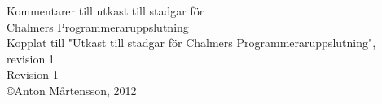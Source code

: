 \documentclass[a4paper]{article}
\begin{document}
\begin{center}
	{\Huge Kommentarer till utkast till stadgar för} \\[0.5em]
	{\Huge Chalmers Programmeraruppslutning} \\[1em]
	{Kopplat till "Utkast till stadgar för Chalmers Programmeraruppslutning", revision 1} \\[1em]
	{Revision 1} \\
	{\copyright Anton Mårtensson, 2012}
\end{center}



\end{document}
